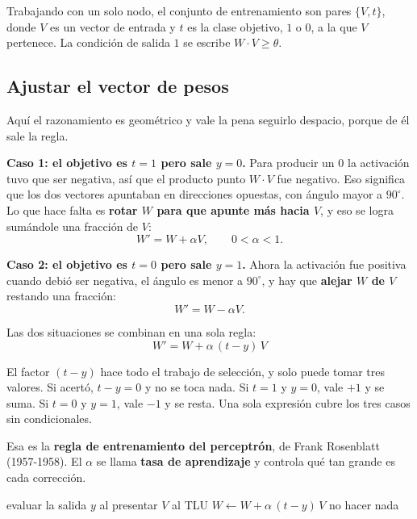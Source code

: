 \documentclass[11pt,letterpaper]{article}
\begin{document}
Trabajando con un solo nodo, el conjunto de entrenamiento son pares
$\{V, t\}$, donde $V$ es un vector de entrada y $t$ es la clase
objetivo, $1$ o $0$, a la que $V$ pertenece. La condición de salida
$1$ se escribe $W \cdot V \geq \theta$.

\subsection*{Ajustar el vector de pesos}

Aquí el razonamiento es geométrico y vale la pena seguirlo despacio,
porque de él sale la regla.

\textbf{Caso 1: el objetivo es $t = 1$ pero sale $y = 0$.} Para
producir un $0$ la activación tuvo que ser negativa, así que el
producto punto $W \cdot V$ fue negativo. Eso significa que los dos
vectores apuntaban en direcciones opuestas, con ángulo mayor a
$90^{\circ}$. Lo que hace falta es \textbf{rotar $W$ para que apunte
más hacia $V$}, y eso se logra sumándole una fracción de $V$:
\[
    W' = W + \alpha V , \qquad 0 < \alpha < 1 .
\]

\textbf{Caso 2: el objetivo es $t = 0$ pero sale $y = 1$.} Ahora la
activación fue positiva cuando debió ser negativa, el ángulo es menor
a $90^{\circ}$, y hay que \textbf{alejar $W$ de $V$} restando una
fracción:
\[
    W' = W - \alpha V .
\]

Las dos situaciones se combinan en una sola regla:
\[
    \boxed{\;W' = W + \alpha\,(t - y)\,V\;}
\]

\begin{idea}
  El factor $(t - y)$ hace todo el trabajo de selección, y solo puede
  tomar tres valores. Si acertó, $t - y = 0$ y no se toca nada. Si
  $t=1$ y $y=0$, vale $+1$ y se suma. Si $t=0$ y $y=1$, vale $-1$ y
  se resta. Una sola expresión cubre los tres casos sin condicionales.
\end{idea}

Esa es la \textbf{regla de entrenamiento del perceptrón}, de Frank
Rosenblatt (1957-1958). El $\alpha$ se llama \textbf{tasa de
aprendizaje} y controla qué tan grande es cada corrección.

\begin{algorithm}[H]
\caption{Aprendizaje del perceptrón}
\begin{algorithmic}[1]
\Repeat
    \State evaluar la salida $y$ al presentar $V$ al TLU
      \State $W \gets W + \alpha\,(t - y)\,V$
    \Else
      \State no hacer nada
    \EndIf
  \EndFor
{}
\end{algorithmic}
\end{algorithm}
\end{document}
